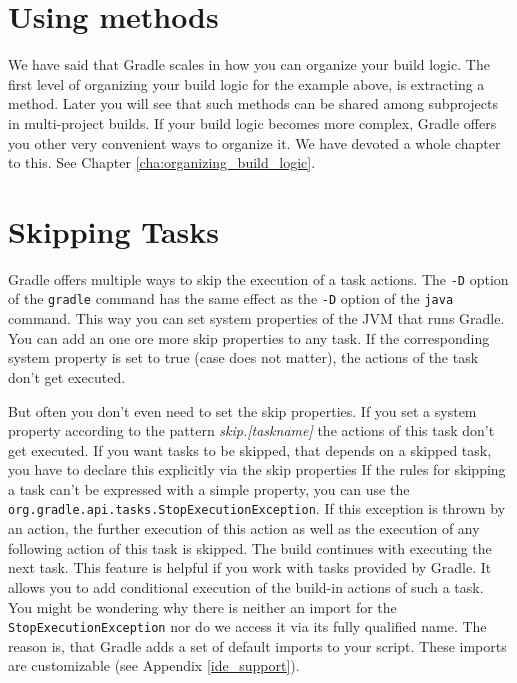 \section{Using methods}
We have said that Gradle scales in how you can organize your build logic. The first level of organizing your build logic for the example above, is extracting a method.
Later you will see that such methods can be shared among subprojects in multi-project builds. If your build logic becomes more complex, Gradle offers you other very convenient ways to organize it. We have devoted a whole chapter to this. See Chapter \ref{cha:organizing_build_logic}. 

\section{Skipping Tasks}
Gradle offers multiple ways to skip the execution of a task actions.
The \texttt{-D} option of the \texttt{gradle} command has the same effect as the \texttt{-D} option of the \texttt{java} command. This way you can set system properties of the JVM that runs Gradle. You can add an one ore more skip properties to any task. If the corresponding system property is set to true (case does not matter), the actions of the task don't get executed.

But often you don't even need to set the skip properties. If you set a system property according to the pattern \emph{skip.[taskname]} the actions of this task don't get executed.
If you want tasks to be skipped, that depends on a skipped task, you have to declare this explicitly via the skip properties
%
If the rules for skipping a task can't be expressed with a simple property, you can use the \texttt{org.gradle.api.tasks.StopExecutionException}. If this exception is thrown by an action, the further execution of this action as well as the execution of any following action of this task is skipped. The build continues with executing the next task.
%
This feature is helpful if you work with tasks provided by Gradle. It allows you to add conditional execution of the build-in actions of such a task. 
You might be wondering why there is neither an import for the \texttt{StopExecutionException} nor do we access it via its fully qualified name. The reason is, that Gradle adds a set of default imports to your script. These imports are customizable (see Appendix \ref{ide_support}).

